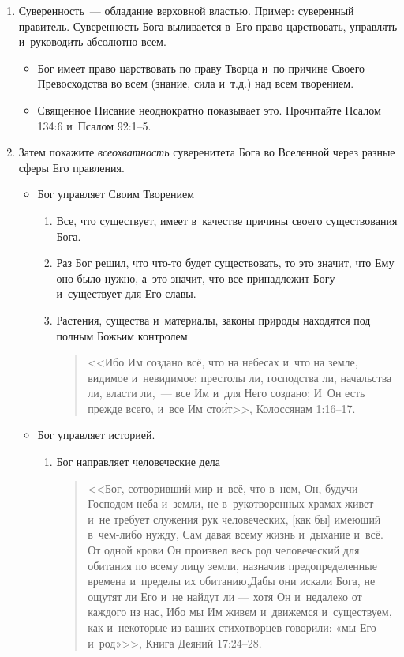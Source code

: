 \documentclass[a4paper,12pt]{article}
\begin{document}
\begin{enumerate}

    \item Суверенность~--- обладание верховной властью. Пример: суверенный правитель. Суверенность Бога выливается в~Его право царствовать, управлять и~руководить абсолютно всем.
    \begin{itemize}
        \item Бог имеет право царствовать по праву Творца и~по причине Своего Превосходства во всем (знание, сила и~т.д.) над всем творением.
        \item Священное Писание неоднократно показывает это. Прочитайте Псалом 134:6 и~Псалом 92:1--5.
    \end{itemize}

    \item Затем покажите \emph{всеохватность} суверенитета Бога во Вселенной через разные сферы Его правления.

    \begin{itemize}
    \item Бог управляет Своим Творением
    
    \begin{enumerate}
        \item Все, что существует, имеет в~качестве причины своего существования Бога.
        \item Раз Бог решил, что что-то будет существовать, то это значит, что Ему оно было нужно, а~это значит, что все принадлежит Богу и~существует для Его славы. 
        \item Растения, существа и~материалы, законы природы находятся под полным Божьим контролем
        \begin{quote}
        <<Ибо Им создано всё, что на небесах и~что на земле, видимое и~невидимое: престолы ли, господства ли, начальства ли, власти ли,~--- все Им и~для Него создано; И~Он есть прежде всего, и~все Им сто\'{и}т>>, Колоссянам 1:16--17.
        \end{quote} 
    \end{enumerate}
    \item Бог управляет историей.
    \begin{enumerate}
        \item Бог направляет человеческие дела 
        \begin{quote}
        <<Бог, сотворивший мир и~всё, что в~нем, Он, будучи Господом неба и~земли, не в~рукотворенных храмах живет и~не требует служения рук человеческих, [как бы] имеющий в~чем-либо нужду, Сам давая всему жизнь и~дыхание и~всё. От одной крови Он произвел весь род человеческий для обитания по всему лицу земли, назначив предопределенные времена и~пределы их обитанию,Дабы они искали Бога, не ощутят ли Его и~не найдут ли — хотя Он и~недалеко от каждого из нас, Ибо мы Им живем и~движемся и~существуем, как и~некоторые из ваших стихотворцев говорили: «мы Его и~род»>>, Книга Деяний 17:24--28.
        \end{quote}


\end{enumerate}
\end{itemize}
\end{enumerate}
\end{document}
